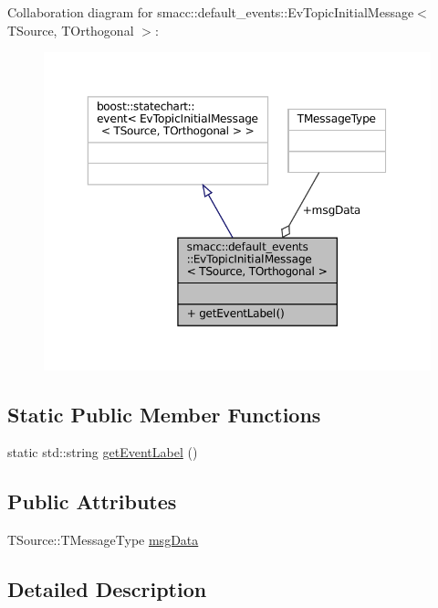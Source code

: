 Collaboration diagram for smacc\+:\+:default\+\_\+events\+:\+:Ev\+Topic\+Initial\+Message$<$ T\+Source, T\+Orthogonal $>$\+:
\nopagebreak
\begin{figure}[H]
\begin{center}
\leavevmode
\includegraphics[width=350pt]{structsmacc_1_1default__events_1_1EvTopicInitialMessage__coll__graph}
\end{center}
\end{figure}
\subsection*{Static Public Member Functions}
\begin{DoxyCompactItemize}
\item 
static std\+::string \hyperlink{structsmacc_1_1default__events_1_1EvTopicInitialMessage_a4ca5f8050156f87ffc6f6f02635635e2}{get\+Event\+Label} ()
\end{DoxyCompactItemize}
\subsection*{Public Attributes}
\begin{DoxyCompactItemize}
\item 
T\+Source\+::\+T\+Message\+Type \hyperlink{structsmacc_1_1default__events_1_1EvTopicInitialMessage_a0cc6d194c202e33c3fbc9bf0a3528256}{msg\+Data}
\end{DoxyCompactItemize}


\subsection{Detailed Description}
